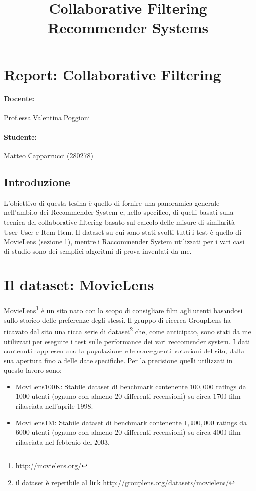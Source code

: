 \documentclass[12pt]{article}
\begin{document}
\section*{Report: Collaborative Filtering}
\title{Collaborative Filtering Recommender Systems}

\paragraph*{Docente: }
Prof.essa Valentina Poggioni

\paragraph*{Studente: }
Matteo Capparrucci (280278)


\subsection*{Introduzione}
L'obiettivo di questa tesina è quello di fornire una panoramica generale nell'ambito dei Recommender System e, nello specifico, di quelli basati sulla tecnica del collaborative filtering basato sul calcolo delle misure di similarità User-User e Item-Item. Il dataset su cui sono stati svolti tutti i test è quello di MovieLens (sezione \ref{sec:MovieLens}), mentre i Raccommender System utilizzati per i vari casi di studio sono dei semplici algoritmi di prova inventati da me.



\section{Il dataset: MovieLens}
\label{sec:MovieLens}

MovieLens\footnote{http://movielens.org/} è un sito nato con lo scopo di consigliare film agli utenti basandosi sullo storico delle preferenze degli stessi. Il gruppo di ricerca GroupLens ha ricavato dal sito una ricca serie di dataset\footnote{il dataset è reperibile al link http://grouplens.org/datasets/movielens/} che, come anticipato, sono stati da me utilizzati per eseguire i test sulle performance dei vari reccomender system.
I dati contenuti rappresentano la popolazione e le conseguenti votazioni del sito, dalla sua apertura fino a delle date specifiche.
Per la precisione quelli utilizzati in questo lavoro sono:
\begin{itemize}
\item{MoviLens100K:}  Stabile dataset di benchmark contenente $100,000$ ratings da $1000$ utenti (ognuno con almeno 20 differenti recensioni) su circa $1700$ film rilasciata nell'aprile 1998.
\item{MoviLens1M:} \label{MoviLens1M} Stabile dataset di benchmark contenente $1,000,000$ ratings da $6000$ utenti (ognuno con almeno 20 differenti recensioni) su circa $4000$ film rilasciata nel febbraio del 2003.
\end{itemize}
\end{document}
